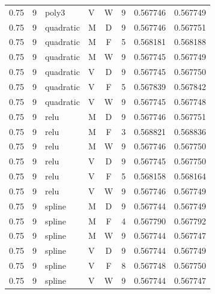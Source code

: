 \begin{longtable}{rrllcrrr}
0.75 & 9 & poly3 & V & W & 9 & 0.567746 & 0.567749 \\

0.75 & 9 & quadratic & M & D & 9 & 0.567746 & 0.567751 \\

0.75 & 9 & quadratic & M & F & 5 & 0.568181 & 0.568188 \\

0.75 & 9 & quadratic & M & W & 9 & 0.567745 & 0.567749 \\

0.75 & 9 & quadratic & V & D & 9 & 0.567745 & 0.567750 \\

0.75 & 9 & quadratic & V & F & 5 & 0.567839 & 0.567842 \\

0.75 & 9 & quadratic & V & W & 9 & 0.567745 & 0.567748 \\

0.75 & 9 & relu & M & D & 9 & 0.567746 & 0.567751 \\

0.75 & 9 & relu & M & F & 3 & 0.568821 & 0.568836 \\

0.75 & 9 & relu & M & W & 9 & 0.567746 & 0.567750 \\

0.75 & 9 & relu & V & D & 9 & 0.567745 & 0.567750 \\

0.75 & 9 & relu & V & F & 5 & 0.568158 & 0.568164 \\

0.75 & 9 & relu & V & W & 9 & 0.567746 & 0.567749 \\

0.75 & 9 & spline & M & D & 9 & 0.567744 & 0.567749 \\

0.75 & 9 & spline & M & F & 4 & 0.567790 & 0.567792 \\

0.75 & 9 & spline & M & W & 9 & 0.567744 & 0.567747 \\

0.75 & 9 & spline & V & D & 9 & 0.567744 & 0.567749 \\

0.75 & 9 & spline & V & F & 8 & 0.567748 & 0.567750 \\

0.75 & 9 & spline & V & W & 9 & 0.567744 & 0.567747 \\

\bottomrule\end{longtable}\endgroup

